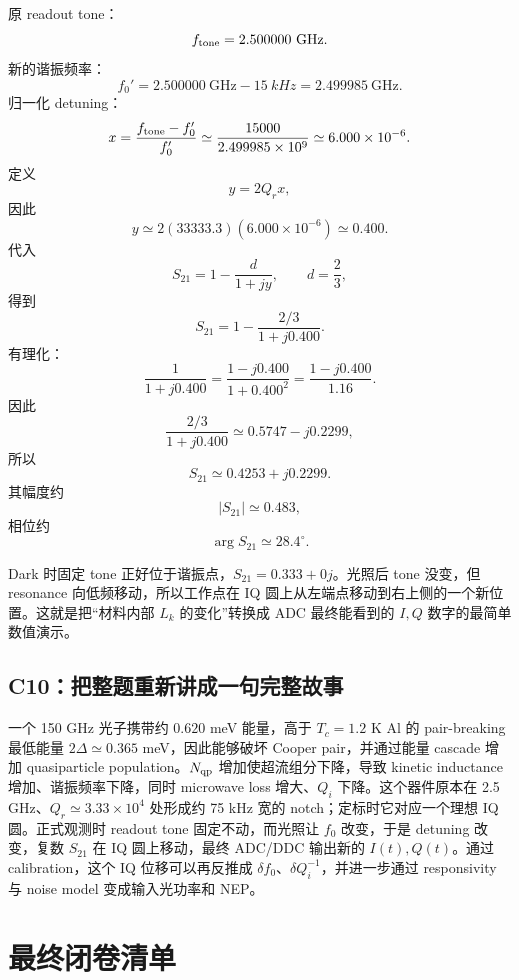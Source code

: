 \documentclass[11pt,a4paper,openany]{ctexrep}
\begin{document}
原 readout tone：
\[
f_{\rm tone}=2.500000\ \mathrm{GHz}.
\]
新的谐振频率：
\[
f_0'=2.500000\ \mathrm{GHz}-\SI{15}{kHz}
=2.499985\ \mathrm{GHz}.
\]
归一化 detuning：
\[
x=\frac{f_{\rm tone}-f_0'}{f_0'}
\simeq\frac{15000}{2.499985\times10^9}
\simeq6.000\times10^{-6}.
\]
定义
\[
y=2Q_r x,
\]
因此
\[
y\simeq2(33333.3)(6.000\times10^{-6})
\simeq0.400.
\]
代入
\[
S_{21}=1-\frac{d}{1+jy},
\qquad d=\frac23,
\]
得到
\[
S_{21}
=1-\frac{2/3}{1+j0.400}.
\]
有理化：
\[
\frac{1}{1+j0.400}
=\frac{1-j0.400}{1+0.400^2}
=\frac{1-j0.400}{1.16}.
\]
因此
\[
\frac{2/3}{1+j0.400}
\simeq0.5747-j0.2299,
\]
所以
\[
\boxed{
S_{21}\simeq0.4253+j0.2299
}.
\]
其幅度约
\[
|S_{21}|\simeq0.483,
\]
相位约
\[
\arg S_{21}\simeq28.4^\circ.
\]

\begin{answerbox}[title=为什么这个结果值得算？]
Dark 时固定 tone 正好位于谐振点，$S_{21}=0.333+0j$。光照后 tone 没变，但 resonance 向低频移动，所以工作点在 IQ 圆上从左端点移动到右上侧的一个新位置。这就是把“材料内部 $L_k$ 的变化”转换成 ADC 最终能看到的 $I,Q$ 数字的最简单数值演示。
\end{answerbox}

\subsection*{C10：把整题重新讲成一句完整故事}

一个 150 GHz 光子携带约 $0.620$ meV 能量，高于 $T_c=1.2$ K Al 的 pair-breaking 最低能量 $2\Delta\simeq0.365$ meV，因此能够破坏 Cooper pair，并通过能量 cascade 增加 quasiparticle population。$N_{\rm qp}$ 增加使超流组分下降，导致 kinetic inductance 增加、谐振频率下降，同时 microwave loss 增大、$Q_i$ 下降。这个器件原本在 2.5 GHz、$Q_r\simeq3.33\times10^4$ 处形成约 75 kHz 宽的 notch；定标时它对应一个理想 IQ 圆。正式观测时 readout tone 固定不动，而光照让 $f_0$ 改变，于是 detuning 改变，复数 $S_{21}$ 在 IQ 圆上移动，最终 ADC/DDC 输出新的 $I(t),Q(t)$。通过 calibration，这个 IQ 位移可以再反推成 $\delta f_0$、$\delta Q_i^{-1}$，并进一步通过 responsivity 与 noise model 变成输入光功率和 NEP。

\section{最终闭卷清单}
\end{document}
